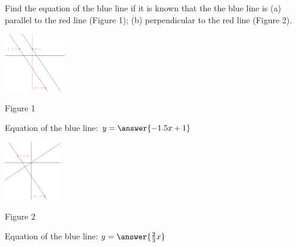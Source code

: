 \documentclass{ximera}
\begin{document}
\begin{problem}\label{prob:160hom4prob6}
Find the equation of the blue line if it is known that the the blue line is (a) parallel to the red line (Figure 1); (b) perpendicular to the red line (Figure 2).
\begin{image}
   \includegraphics[height=1in]{160H4pic5.jpg}
 \end{image}
 \begin{center}
     Figure 1
 \end{center}
 Equation of the blue line: $y=\answer{-1.5x+1}$
 \begin{image}
   \includegraphics[height=1in]{160H4pic6.jpg}
 \end{image}
 \begin{center}
     Figure 2
 \end{center}
  Equation of the blue line: $y=\answer{\frac{2}{3}x}$
\end{problem}
\end{document}
